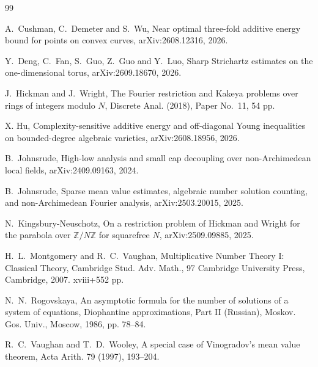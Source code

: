 \documentclass[11pt, twoside]{article}
\numberwithin{equation}{section}
\theoremstyle{definition}
\begin{document}
\begin{thebibliography}{99}

A.~Cushman, C.~Demeter and S.~Wu, Near optimal three-fold additive energy
bound for points on convex curves, arXiv:2608.12316, 2026.
\vspace{-0.3cm}

Y.~Deng, C.~Fan, S.~Guo, Z.~Guo and Y.~Luo, Sharp Strichartz estimates 
on the one-dimensional torus, arXiv:2609.18670, 2026.

\vspace{-0.3cm}

J.~Hickman and J.~Wright, The Fourier restriction and Kakeya problems over
rings of integers modulo $N$, Discrete Anal. (2018), Paper No.~11, 54 pp.

\vspace{-0.3cm}

X. Hu, Complexity-sensitive additive energy and off-diagonal Young
inequalities on bounded-degree algebraic varieties, arXiv:2608.18956, 2026. 

\vspace{-0.3cm}

B.~Johnsrude, High-low analysis and small cap decoupling over
non-Archimedean local fields, arXiv:2409.09163, 2024.

\vspace{-0.3cm}

B.~Johnsrude, Sparse mean value estimates, algebraic number solution
counting, and non-Archimedean Fourier analysis, arXiv:2503.20015, 2025.

\vspace{-0.3cm}

N.~Kingsbury-Neuschotz, On a restriction problem of Hickman and Wright
for the parabola over $\mathbb Z/N\mathbb Z$ for squarefree $N$,
arXiv:2509.09885, 2025.

\vspace{-0.3cm}

H.~L.~Montgomery and R.~C.~Vaughan, Multiplicative Number Theory I:
Classical Theory, Cambridge Stud. Adv. Math., 97 Cambridge University Press, Cambridge, 2007. xviii+552 pp.

\vspace{-0.3cm}

N.~N.~Rogovskaya, An asymptotic formula for the number of solutions of
a system of equations, Diophantine approximations, Part II (Russian), Moskov. Gos. Univ., Moscow, 1986, pp. 78--84.

\vspace{-0.3cm}

R.~C.~Vaughan and T.~D.~Wooley, A special case of Vinogradov's mean value
theorem, Acta Arith. 79 (1997), 193--204.

\end{thebibliography}
\end{document}
